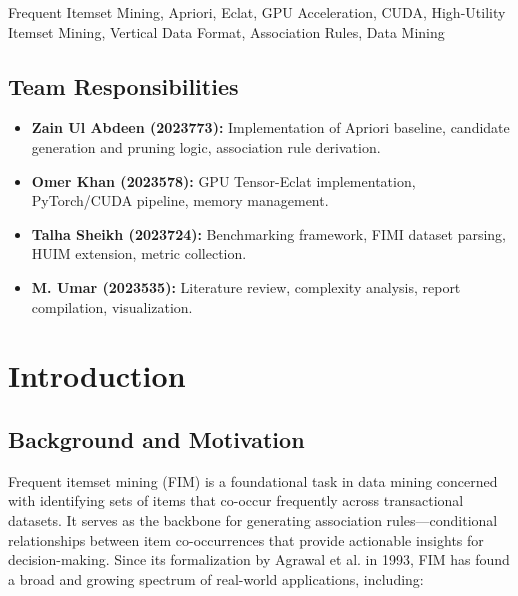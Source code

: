 \documentclass[conference]{IEEEtran}
\begin{document}
\begin{IEEEkeywords}
Frequent Itemset Mining, Apriori, Eclat, GPU Acceleration, CUDA, High-Utility Itemset Mining, Vertical Data Format, Association Rules, Data Mining
\end{IEEEkeywords}

\subsection*{Team Responsibilities}
\begin{itemize}
    \item \textbf{Zain Ul Abdeen (2023773):} Implementation of Apriori baseline, candidate generation and pruning logic, association rule derivation.
    \item \textbf{Omer Khan (2023578):} GPU Tensor-Eclat implementation, PyTorch/CUDA pipeline, memory management.
    \item \textbf{Talha Sheikh (2023724):} Benchmarking framework, FIMI dataset parsing, HUIM extension, metric collection.
    \item \textbf{M. Umar (2023535):} Literature review, complexity analysis, report compilation, visualization.
\end{itemize}

\section{Introduction}

\subsection{Background and Motivation}
Frequent itemset mining (FIM) is a foundational task in data mining concerned with identifying sets of items that co-occur frequently across transactional datasets. It serves as the backbone for generating association rules---conditional relationships between item co-occurrences that provide actionable insights for decision-making. Since its formalization by Agrawal et al. in 1993, FIM has found a broad and growing spectrum of real-world applications, including:
\end{document}
